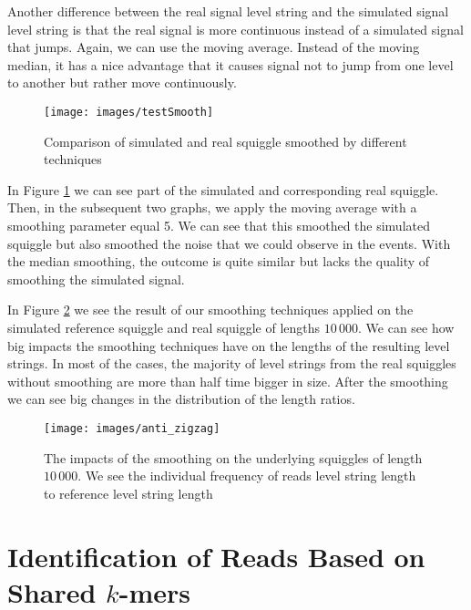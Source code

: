 Another difference between the real signal level string
and the simulated signal level string is that the real signal is more continuous instead
of a simulated signal that jumps. Again, we can use the moving average. Instead of
the moving median, it has a nice advantage that it causes signal not to jump from
one level to another but rather move continuously.

\begin{figure}
\centerline{\texttt{[image: images/testSmooth]}}
\caption[Hehe]{Comparison of simulated and real squiggle smoothed by different techniques}
\label{obr:testSmooth}
\end{figure}

In Figure \ref{obr:testSmooth} we can see part of the simulated and corresponding real squiggle.
Then, in the subsequent two graphs, we apply the moving average with a smoothing parameter
equal 5. We can see that this smoothed the simulated squiggle but also smoothed the noise
that we could observe in the events. With the median smoothing, the outcome is quite
similar but lacks the quality of smoothing the simulated signal.

In Figure \ref{obr:anti_zigzag} we see the result of our smoothing techniques
applied on the simulated reference squiggle and real squiggle of lengths $10\,000$. We can see how
big impacts the smoothing techniques have on the lengths of the resulting level strings.
In most of the cases, the majority of level strings from the real squiggles without smoothing
are more than half time bigger in size. After the smoothing we can see big changes in
the distribution of the length ratios.

\begin{figure}
\centerline{\texttt{[image: images/anti\_zigzag]}}
\caption[Hehe]{The impacts of the smoothing on the underlying squiggles of length $10\,000$. We see the individual 
frequency of reads level string length to reference level string length}
\label{obr:anti_zigzag}
\end{figure}

\section{Identification of Reads Based on Shared $k$-mers}
\label{section:readIdentification}

